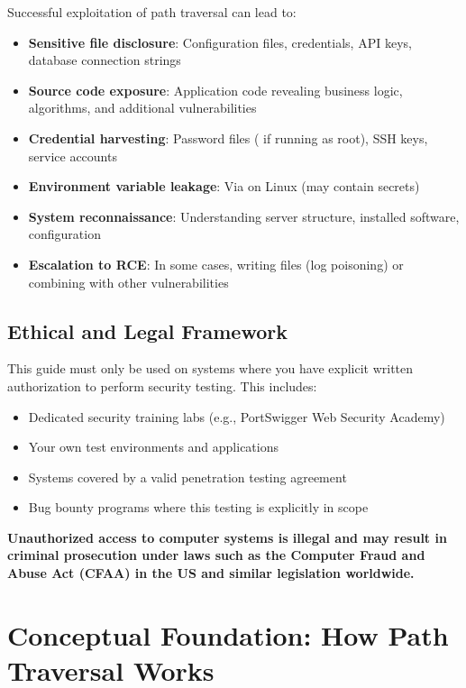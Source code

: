 \documentclass[11pt,letterpaper]{article}
\newcommand{\code}[1]{\texttt{\detokenize{#1}}}
\begin{document}
Successful exploitation of path traversal can lead to:

\begin{itemize}
  \item \textbf{Sensitive file disclosure}: Configuration files, credentials, API keys, database connection strings
  \item \textbf{Source code exposure}: Application code revealing business logic, algorithms, and additional vulnerabilities
  \item \textbf{Credential harvesting}: Password files (\code{/etc/shadow} if running as root), SSH keys, service accounts
  \item \textbf{Environment variable leakage}: Via \code{/proc/self/environ} on Linux (may contain secrets)
  \item \textbf{System reconnaissance}: Understanding server structure, installed software, configuration
  \item \textbf{Escalation to RCE}: In some cases, writing files (log poisoning) or combining with other vulnerabilities
\end{itemize}

\subsection{Ethical and Legal Framework}

\begin{warningbox}
This guide must only be used on systems where you have explicit written authorization to perform security testing. This includes:
\begin{itemize}
  \item Dedicated security training labs (e.g., PortSwigger Web Security Academy)
  \item Your own test environments and applications
  \item Systems covered by a valid penetration testing agreement
  \item Bug bounty programs where this testing is explicitly in scope
\end{itemize}

\textbf{Unauthorized access to computer systems is illegal and may result in criminal prosecution under laws such as the Computer Fraud and Abuse Act (CFAA) in the US and similar legislation worldwide.}
\end{warningbox}

\section{Conceptual Foundation: How Path Traversal Works}
\end{document}
